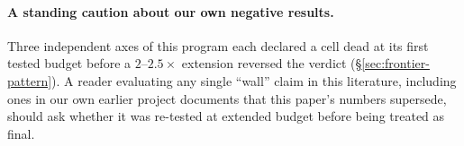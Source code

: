 \paragraph{A standing caution about our own negative results.} Three
independent axes of this program each declared a cell dead at its first
tested budget before a $2$--$2.5\times$ extension reversed the verdict
(\S\ref{sec:frontier-pattern}). A reader evaluating any single ``wall''
claim in this literature, including ones in our own earlier project
documents that this paper's numbers supersede, should ask whether it was
re-tested at extended budget before being treated as final.
